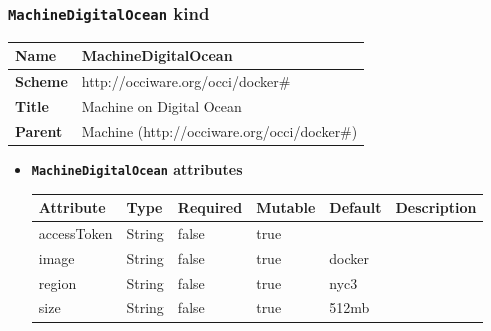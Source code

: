 \subsubsection{\texttt{MachineDigitalOcean} kind}
\begin{center}
\begin{tabular}{|l|l|}
  \hline
  \textbf{Name} & MachineDigitalOcean \\
  \hline  
  \textbf{Scheme} & http://occiware.org/occi/docker\# \\
  \hline
  \textbf{Title} & Machine on Digital Ocean \\
  \hline
  \textbf{Parent} & Machine (http://occiware.org/occi/docker\#) \\
  \hline
\end{tabular}
\end{center}
\begin{itemize}
\item \textbf{\texttt{MachineDigitalOcean} attributes}

\begin{tabularx}{\textwidth}{|l|l|p{1.4cm}|p{1.3cm}|l|X|}
  \hline
  \textbf{Attribute} & \textbf{Type} & \textbf{Required} & \textbf{Mutable} & \textbf{Default} & \textbf{Description} \\
  \hline  
  accessToken & String & false & true &  &  \\
  \hline
  image & String & false & true & docker &  \\
  \hline
  region & String & false & true & nyc3 &  \\
  \hline
  size & String & false & true & 512mb &  \\
  \hline
\end{tabularx}
\end{itemize}




